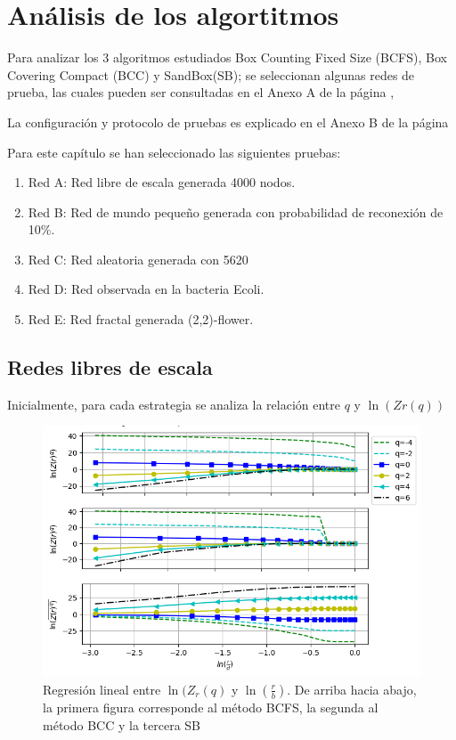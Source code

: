 \section{Análisis de los algortitmos}\label{sec:cap4analisis}

Para analizar los 3 algoritmos estudiados Box Counting Fixed Size (BCFS), Box Covering Compact (BCC) y SandBox(SB); se seleccionan algunas redes de prueba, las cuales pueden ser consultadas en el Anexo A de la página \pageref{AnexoA},

La configuración y protocolo de pruebas es explicado en el Anexo B de la página \pageref{AnexoB}

Para este capítulo se han seleccionado las siguientes pruebas:

\begin{enumerate}
    \item Red A: Red libre de escala generada 4000 nodos.
    \item Red B: Red de mundo pequeño generada con probabilidad de reconexión de 10\%.
    \item Red C: Red aleatoria generada con 5620
    \item Red D: Red observada en la bacteria Ecoli.
    \item Red E: Red fractal generada (2,2)-flower.
\end{enumerate}

\subsection{Redes libres de escala}

Inicialmente, para cada estrategia se analiza la relación entre $q$ y $\ln(Zr(q))$

\begin{figure}[H]
    \centering
    \includegraphics[scale=0.8]{Capitulo4Multifractalidad/imagenes/scaleFree4000_TqLnrBCscaleFree4000Nodes.png}

    \caption{Regresión lineal entre $\ln(Z_r(q)$ y $\ln(\frac{r}{b})$. De arriba hacia abajo, la primera figura corresponde al método BCFS, la segunda al método BCC y la tercera SB}
\end{figure}

